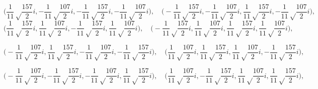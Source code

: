 \documentclass[10pt]{amsart}
\theoremstyle{definition}
\theoremstyle{remark}
\begin{document}
$$\Big(\frac{1}{11}\sqrt\frac{157}{2}i,-\frac{1}{11}\sqrt\frac{107}{2}i,-\frac{1}{11}\sqrt\frac{157}{2}i,-\frac{1}{11}\sqrt\frac{107}{2}i\Big),\quad \Big(-\frac{1}{11}\sqrt\frac{157}{2}i,-\frac{1}{11}\sqrt\frac{107}{2}i,\frac{1}{11}\sqrt\frac{157}{2}i,-\frac{1}{11}\sqrt\frac{107}{2}i\Big),$$
$$\Big(\frac{1}{11}\sqrt\frac{157}{2}i,\frac{1}{11}\sqrt\frac{107}{2}i,-\frac{1}{11}\sqrt\frac{157}{2}i,\frac{1}{11}\sqrt\frac{107}{2}i\Big),\quad \Big(-\frac{1}{11}\sqrt\frac{157}{2}i,\frac{1}{11}\sqrt\frac{107}{2}i,\frac{1}{11}\sqrt\frac{157}{2}i,\frac{1}{11}\sqrt\frac{107}{2}i\Big),$$

$$\Big(-\frac{1}{11}\sqrt\frac{107}{2}i,\frac{1}{11}\sqrt\frac{157}{2}i,-\frac{1}{11}\sqrt\frac{107}{2}i,-\frac{1}{11}\sqrt\frac{157}{2}i\Big),\quad \Big(\frac{1}{11}\sqrt\frac{107}{2}i,\frac{1}{11}\sqrt\frac{157}{2}i,\frac{1}{11}\sqrt\frac{107}{2}i,-\frac{1}{11}\sqrt\frac{157}{2}i\Big),$$


$$\Big(-\frac{1}{11}\sqrt\frac{107}{2}i,-\frac{1}{11}\sqrt\frac{157}{2}i,-\frac{1}{11}\sqrt\frac{107}{2}i,\frac{1}{11}\sqrt\frac{157}{2}i\Big),\quad \Big(\frac{1}{11}\sqrt\frac{107}{2}i,-\frac{1}{11}\sqrt\frac{157}{2}i,\frac{1}{11}\sqrt\frac{107}{2}i,\frac{1}{11}\sqrt\frac{157}{2}i\Big),$$
\end{document}
